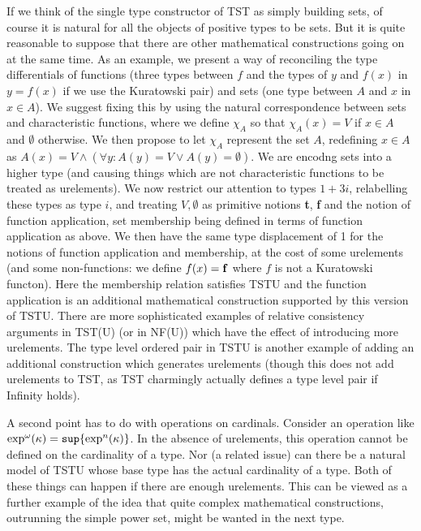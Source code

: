\documentclass[12pt]{article}
\begin{document}
If we think of the single type constructor of TST as simply building sets, of course it is natural for all the objects of positive types to be sets.  But it is quite reasonable to suppose that there are other mathematical constructions going on at the same time.
As an example, we present a way of reconciling the type differentials of functions (three types between $f$ and the types of $y$ and $f(x)$ in $y=f(x)$ if we use the Kuratowski pair) and sets (one type between $A$ and $x$ in $x \in A$).  We suggest fixing this by using the natural correspondence between sets and characteristic functions, where we define $\chi_A$ so that $\chi_A(x) = V$ if $x \in A$ and $\emptyset$ otherwise.  We then propose to let $\chi_A$ represent the set $A$, redefining
$x \in A$ as $A(x) = V \wedge (\forall y:A(y) = V \vee A(y) = \emptyset)$.  We are encodng sets into a higher type (and causing things which are not characteristic functions to be treated as urelements).  We now restrict our attention to types
$1+3i$, relabelling these types as type $i$, and treating $V, \emptyset$ as primitive notions {\bf t}, {\bf f} and the notion of function application, set membership being defined in terms of function application as above.  We then have the same type displacement of 1 for the notions of function application and membership, at the cost of some urelements (and some non-functions:  we define $f(x) = {\bf f}$ where $f$ is not a Kuratowski functon).  Here the membership relation satisfies TSTU and the function application is an additional mathematical construction supported by this version of TSTU.  There are more sophisticated examples of relative consistency arguments in TST(U) (or in NF(U)) which have the effect of introducing more urelements.
The type level ordered pair in TSTU is another example of adding an additional construction which generates urelements (though this does not add urelements to TST, as TST charmingly actually defines a type level pair if Infinity holds).

A second point has to do with operations on cardinals.  Consider an operation like $\exp^{\omega}(\kappa) = {\tt sup}\{\exp^n(\kappa)\}$.  In the absence of urelements, this operation cannot be defined on the cardinality of a type.  Nor (a related issue) can there be a natural model of TSTU whose base type has the actual cardinality of a type.  Both of these things can happen if there are enough urelements.  This can be viewed as a further example of the idea that quite complex mathematical constructions, outrunning the simple power set, might be wanted in the next type.
\end{document}
